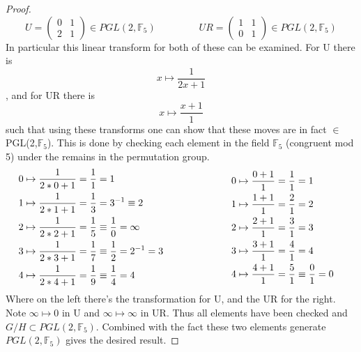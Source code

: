 \documentclass{article}
\begin{document}
\begin{proof}
\begin{equation}
U = \begin{pmatrix} 0 & 1 \\ 2 & 1\end{pmatrix} \in PGL(2,\mathbb{F}_5) \ \ \ \ \ \ \ \ \ \ \ \ \ \ \ \ \ \ \ \ 
UR = \begin{pmatrix} 1 & 1 \\ 0 & 1\end{pmatrix}\in PGL(2,\mathbb{F}_5)
\end{equation}
In particular this linear transform for both of these can be examined. For U there is 
\begin{equation*}
x \mapsto \frac{1}{2x + 1}
\end{equation*}
, and for UR there is 
\begin{equation*}
x \mapsto \frac{x+1}{1}
\end{equation*}
such that using these transforms one can show that these moves are in fact $\in$ PGL(2,$\mathbb{F}_5$). This is done by checking each element in the field $\mathbb{F}_5$ (congruent mod 5) under the remains in the permutation group.
\begin{alignat*}{2}
& \begin{aligned}
0 &\mapsto \frac{1}{2*0 + 1} = \frac{1}{1} = 1\\
1 &\mapsto \frac{1}{2*1 + 1} = \frac{1}{3} = 3^{-1} \equiv 2\\
2 &\mapsto \frac{1}{2*2 + 1} = \frac{1}{5} \equiv \frac{1}{0} = \infty\\
3 &\mapsto \frac{1}{2*3 + 1} = \frac{1}{7} \equiv \frac{1}{2} = 2^{-1} = 3\\
4 &\mapsto \frac{1}{2*4 + 1} = \frac{1}{9} \equiv \frac{1}{4} = 4
\end{aligned}
& \hskip 6em &
\begin{aligned}
0 &\mapsto \frac{0 + 1}{1} = \frac{1}{1} = 1\\
1 &\mapsto \frac{1 + 1}{1} = \frac{2}{1} = 2\\
2 &\mapsto \frac{2 + 1}{1} = \frac{3}{1} = 3\\
3 &\mapsto \frac{3 + 1}{1} = \frac{4}{1} = 4\\
4 &\mapsto \frac{4 + 1}{1} = \frac{5}{1} \equiv \frac{0}{1} = 0
\end{aligned}
\end{alignat*}
Where on the left there's the transformation for U, and the UR for the right. Note $\infty \mapsto 0$ in U and $\infty \mapsto \infty$ in UR. Thus all elements have been checked and $G/H \subset PGL(2,\mathbb{F}_5)$. Combined with the fact these two elements generate $PGL(2,\mathbb{F}_5)$ gives the desired result. 
\end{proof}
\end{document}

